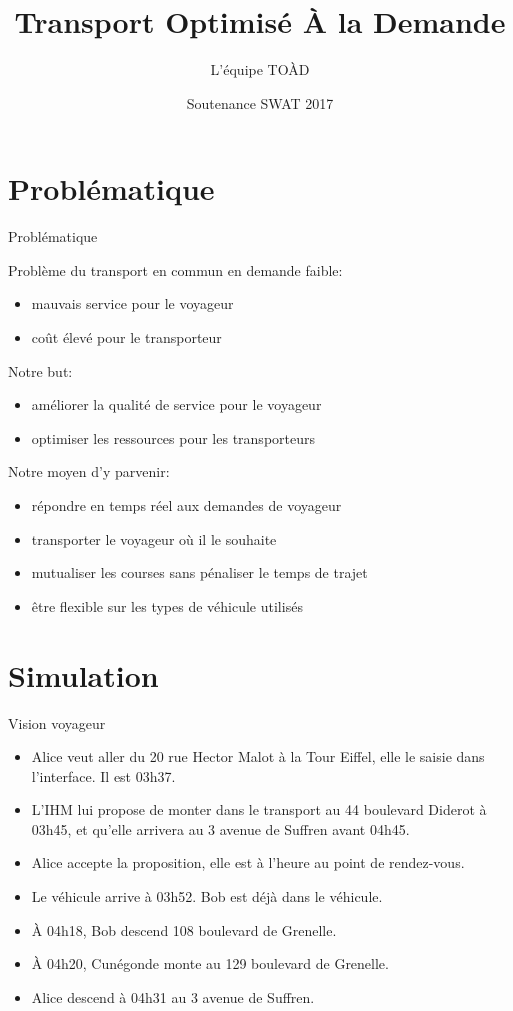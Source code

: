 \documentclass[table]{beamer}
\title{Transport Optimisé À la Demande}
\author{L'équipe TOÀD}
\institute[Kisio Digital] %
{
  Kisio Digital\\
  20 rue Hector Malot\\
  75012 Paris, France}
\date{Soutenance SWAT 2017}
\begin{document}
\begin{frame}
  \titlepage
\end{frame}

\section{Problématique}

\begin{frame}{Problématique}

  Problème du transport en commun en demande faible:
  \begin{itemize}
  \item mauvais service pour le voyageur
  \item coût élevé pour le transporteur
  \end{itemize}

  Notre but:
  \begin{itemize}
  \item améliorer la qualité de service pour le voyageur
  \item optimiser les ressources pour les transporteurs
  \end{itemize}

  Notre moyen d'y parvenir:
  \begin{itemize}
  \item répondre en temps réel aux demandes de voyageur
  \item transporter le voyageur où il le souhaite
  \item mutualiser les courses sans pénaliser le temps de trajet
  \item être flexible sur les types de véhicule utilisés
  \end{itemize}
\end{frame}

\section{Simulation}

\begin{frame}{Vision voyageur}

  \begin{itemize}[<+->]
  \item Alice veut aller du 20 rue Hector Malot à la Tour Eiffel, elle
    le saisie dans l'interface. Il est 03h37.
  \item L'IHM lui propose de monter dans le transport au 44 boulevard
    Diderot à 03h45, et qu'elle arrivera au 3 avenue de Suffren avant
    04h45.
  \item Alice accepte la proposition, elle est à l'heure au point de
    rendez-vous.
  \item Le véhicule arrive à 03h52. Bob est déjà dans le véhicule.
  \item À 04h18, Bob descend 108 boulevard de Grenelle.
  \item À 04h20, Cunégonde monte au 129 boulevard de Grenelle.
  \item Alice descend à 04h31 au 3 avenue de Suffren.
  \end{itemize}
\end{frame}
\end{document}
